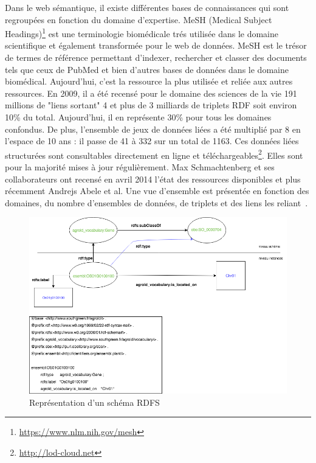 Dans le web sémantique, il existe différentes bases de connaissances qui sont regroupées en fonction du domaine d'expertise. MeSH (Medical Subject Headings)\footnote{\url{https://www.nlm.nih.gov/mesh}} est une terminologie biomédicale trés utilisée dans le domaine scientifique et également transformée pour le web de données. MeSH est le trésor de termes de référence permettant d’indexer, rechercher et classer des documents tels que ceux de PubMed et bien d'autres bases de données dans le domaine biomédical. Aujourd'hui, c'est la ressource la plus utilisée et reliée aux autres ressources. En 2009, il a été recensé pour le domaine des sciences de la vie 191 millions de "liens sortant" 4 et plus de 3 milliards de triplets RDF soit environ 10\% du total. Aujourd'hui, il en représente 30\% pour tous les domaines confondus. De plus, l’ensemble de jeux de données liées a été multiplié par 8 en l'espace de 10 ans : il passe de 41 à 332 sur un total de 1163. Ces données liées structurées sont consultables directement en ligne et téléchargeables\footnote{\url{http://lod-cloud.net}}. Elles sont pour la majorité mises à jour régulièrement. Max Schmachtenberg et ses collaborateurs ont recensé en avril 2014 l'état des ressources disponibles et plus récemment Andrejs Abele et al. Une vue d’ensemble est présentée en fonction des domaines, du nombre d’ensembles de données, de triplets et des liens les reliant~\cite{Schmachtenberg-al2014}.\\

\begin{landscape}
\begin{figure}[!ht]
\begin{center}
	\includegraphics[width=1\textwidth]{Figures/RDF-into.png}
\end{center}
\caption{\label{RDFS} Représentation d'un schéma RDFS }
\end{figure}

\end{landscape}

